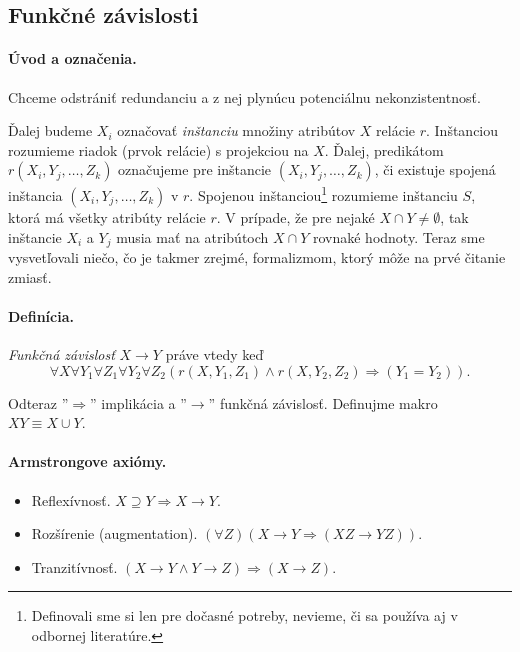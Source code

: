 \documentclass[10pt,a4paper]{article}
\begin{document}
\subsection{Funkčné závislosti}

\paragraph{Úvod a označenia.}
Chceme odstrániť redundanciu a z nej plynúcu potenciálnu nekonzistentnosť.

Ďalej budeme $X_i$ označovať \emph{inštanciu} množiny atribútov $X$ relácie $r$.
Inštanciou rozumieme riadok (prvok relácie) s projekciou na $X$.
Ďalej, predikátom $r(X_i,Y_j, \ldots, Z_k)$ označujeme pre inštancie $(X_i,Y_j, \ldots, Z_k)$, či existuje spojená inštancia $(X_i,Y_j, \ldots, Z_k)$ v $r$.
Spojenou inštanciou\footnote{Definovali sme si len pre dočasné potreby, nevieme, či sa používa aj v odbornej literatúre.}
rozumieme inštanciu $S$, ktorá má všetky atribúty relácie $r$. V prípade, že pre nejaké $X \cap Y \neq \emptyset$, tak inštancie $X_i$ a $Y_j$ musia mať na atribútoch $X \cap Y$ rovnaké hodnoty.
Teraz sme vysvetľovali niečo, čo je takmer zrejmé, formalizmom, ktorý môže na prvé čitanie zmiasť.

\paragraph{Definícia.}
\emph{Funkčná závislosť} $X \rightarrow Y$ práve vtedy keď
$$\forall X \forall Y_1 \forall Z_1 \forall Y_2 \forall Z_2 (r(X, Y_1, Z_1) \wedge r(X, Y_2, Z_2) \Rightarrow (Y_1 = Y_2)).$$

Odteraz ''$\Rightarrow$'' implikácia a ''$\rightarrow$'' funkčná závislosť.
Definujme makro $XY \equiv X \cup Y$.

\paragraph{Armstrongove axiómy.}
\begin{itemize}
\item Reflexívnosť. $X \supseteq Y \Rightarrow X \rightarrow Y$.
\item Rozšírenie (augmentation). $(\forall Z)(X \rightarrow Y \Rightarrow (XZ \rightarrow YZ))$.
\item Tranzitívnosť. $(X \rightarrow Y \wedge Y \rightarrow Z) \Rightarrow (X \rightarrow Z)$.
\end{itemize}
\end{document}
